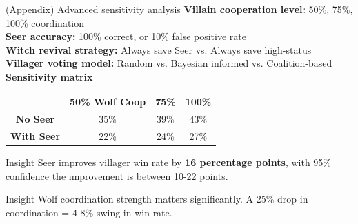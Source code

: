 \documentclass[10pt]{beamer}
\begin{document}
\begin{frame}{(Appendix) Advanced sensitivity analysis}
  \textbf{Villain cooperation level:} 50\%, 75\%, 100\% coordination \\
  \textbf{Seer accuracy:} 100\% correct, or 10\% false positive rate \\
  \textbf{Witch revival strategy:} Always save Seer vs. Always save high-status \\
  \textbf{Villager voting model:} Random vs. Bayesian informed vs. Coalition-based \\

  \textbf{Sensitivity matrix}
  \begin{center}
    \begin{tabular}{cccc}
      & \textbf{50\% Wolf Coop} & \textbf{75\%} & \textbf{100\%} \\
      \textbf{No Seer} & 35\% & 39\% & 43\% \\
      \textbf{With Seer} & 22\% & 24\% & 27\% \\
    \end{tabular}
  \end{center}
  
  \begin{alertblock}{Insight}
    Seer improves villager win rate by \textbf{16 percentage points}, with 95\% confidence the improvement is between 10-22 points.
  \end{alertblock}

  \begin{alertblock}{Insight}
    Wolf coordination strength matters significantly. A 25\% drop in coordination = 4-8\% swing in win rate.
  \end{alertblock}
\end{frame}
\end{document}
